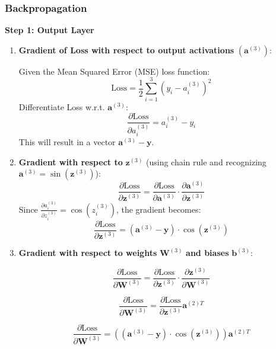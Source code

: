 \documentclass{ioereport}
\begin{document}
\subsubsection{Backpropagation}

\textbf{Step 1: Output Layer}
\begin{enumerate}[label=\textbf{\roman*.}]
  \item \textbf{Gradient of Loss with respect to output activations} $(\mathbf{a}^{(3)})$:
  
  Given the Mean Squared Error (MSE) loss function:
  \begin{equation}
  \text{Loss} = \frac{1}{2} \sum_{i=1}^{3} (y_i - a^{(3)}_i)^2
  \end{equation}
  Differentiate Loss w.r.t. $\mathbf{a}^{(3)}$:
  \begin{equation}
  \frac{\partial \text{Loss}}{\partial a^{(3)}_i} = a^{(3)}_i - y_i
  \end{equation}
  This will result in a vector $\mathbf{a}^{(3)} - \mathbf{y}$.

  \item \textbf{Gradient with respect to} $\mathbf{z}^{(3)}$ (using chain rule and recognizing $\mathbf{a}^{(3)} = \sin(\mathbf{z}^{(3)})$):
  \[
  \frac{\partial \text{Loss}}{\partial \mathbf{z}^{(3)}} = \frac{\partial \text{Loss}}{\partial \mathbf{a}^{(3)}} \cdot \frac{\partial \mathbf{a}^{(3)}}{\partial \mathbf{z}^{(3)}}
  \]
  Since $\frac{\partial a^{(3)}_i}{\partial z^{(3)}_i} = \cos(z^{(3)}_i)$, the gradient becomes:
  \begin{equation}
  \frac{\partial \text{Loss}}{\partial \mathbf{z}^{(3)}} = (\mathbf{a}^{(3)} - \mathbf{y}) \cdot \cos(\mathbf{z}^{(3)})
  \end{equation}

  \item \textbf{Gradient with respect to weights} $\mathbf{W}^{(3)}$ \textbf{and biases} $\mathbf{b}^{(3)}$:
  
  \[
  \frac{\partial \text{Loss}}{\partial \mathbf{W}^{(3)}} = \frac{\partial \text{Loss}}{\partial \mathbf{z}^{(3)}} \cdot \frac{\partial \mathbf{z}^{(3)}}{\partial \mathbf{W}^{(3)}}
  \]
  
  \[
  \frac{\partial \text{Loss}}{\partial \mathbf{W}^{(3)}} = \frac{\partial \text{Loss}}{\partial \mathbf{z}^{(3)}} \mathbf{a}^{(2)T}
  \]
  
  \begin{equation}
  \frac{\partial \text{Loss}}{\partial \mathbf{W}^{(3)}} = \left((\mathbf{a}^{(3)} - \mathbf{y}) \cdot \cos(\mathbf{z}^{(3)})\right) \mathbf{a}^{(2)T}
  \end{equation}



\end{enumerate}
\end{document}
